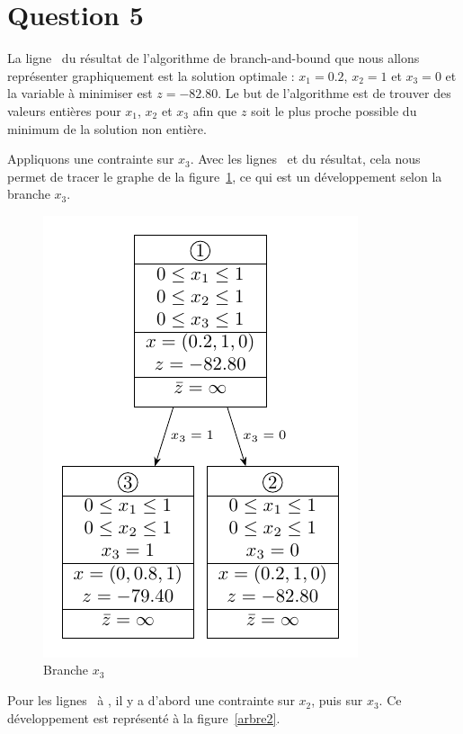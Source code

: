 \section{Question 5}
La ligne~ du résultat de l’algorithme de branch-and-bound que nous allons représenter graphiquement est la solution optimale : $x_1 = 0.2$, $x_2 = 1$ et $x_3 = 0$ et la variable à minimiser est $z = -82.80$. Le but de l’algorithme est de trouver des valeurs entières pour $x_1$, $x_2$ et $x_3$ afin que $z$ soit le plus proche possible du minimum de la solution non entière.

Appliquons une contrainte sur $x_3$. Avec les lignes~ et  du résultat, cela nous permet de tracer le graphe de la figure~\ref{arbre1}, ce qui est un développement selon la branche $x_3$.

\begin{figure}[htb]
	\caption{Branche $x_3$}
	\label{arbre1}
	\centering
	\includegraphics[width=.5\linewidth]{question/forest/1.pdf}
\end{figure}

Pour les lignes~ à , il y a d’abord une contrainte sur $x_2$, puis sur $x_3$. Ce développement est représenté à la figure~\ref{arbre2}.

